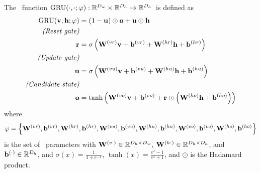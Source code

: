 The \gatedrecurrentunit~function $\operatorname{GRU}(\cdot, \cdot; \varphi) : \mathbb{R}^{D_{w}} \times \mathbb{R}^{D_{h}} \rightarrow \mathbb{R}^{D_{h}}$~is defined as
\begin{align}
\operatorname{GRU}(\mathbf{v}, \mathbf{h}; \varphi) & 
    = (1-\mathbf{u}) \odot \mathbf{o} + \mathbf{u} \odot \mathbf{h} \label{eqn:gru}\\
    \textit{(Reset gate)} & \nonumber \\
\mathbf{r} &= 
    \sigma\left(
      \mathbf{W}^{(vr)} \mathbf{v} 
        + \mathbf{b}^{(vr)} +
      \mathbf{W}^{(hr)} \mathbf{h} 
        + \mathbf{b}^{(hr)} 
    \right)\\
    \textit{(Update gate)} & \nonumber \\
\mathbf{u} &= 
    \sigma\left(
      \mathbf{W}^{(vu)} \mathbf{v} 
        + \mathbf{b}^{(vu)} +
      \mathbf{W}^{(hu)} \mathbf{h} 
        + \mathbf{b}^{(hu)} 
    \right)\\
    \textit{(Candidate state)} & \nonumber \\
\mathbf{o} &= \tanh\left(
    \mathbf{W}^{(vo)} \mathbf{v} 
        + \mathbf{b}^{(vo)} + 
    \mathbf{r} \odot \left(
        \mathbf{W}^{(ho)} \mathbf{h} 
            + \mathbf{b}^{(ho)} 
    \right) \right)
\end{align}
where \[\varphi = \left\{
    \mathbf{W}^{(vr)}, 
    \mathbf{b}^{(vr)}, 
    \mathbf{W}^{(hr)}, 
    \mathbf{b}^{(hr)}, 
    \mathbf{W}^{(vu)}, 
    \mathbf{b}^{(vu)}, 
    \mathbf{W}^{(hu)}, 
    \mathbf{b}^{(hu)},
    \mathbf{W}^{(vo)}, 
    \mathbf{b}^{(vo)}, 
    \mathbf{W}^{(ho)}, 
    \mathbf{b}^{(ho)}
  \right\}\] is the set of \gru~parameters with $\mathbf{W}^{(v\cdot)} \in \mathbb{R}^{D_{h} \times D_{w}}$, 
    $\mathbf{W}^{(h\cdot)} \in \mathbb{R}^{D_{h} \times D_{h}}$, 
    and $\mathbf{b}^{(\cdot)} \in \mathbb{R}^{D_{h} }$, 
    and $\sigma(x) = \frac{1}{1+e^{-x}}$, 
    $\tanh(x) = \frac{e^x-1}{e^x+1}$, and $\odot$ is the Hadamard product.
 
